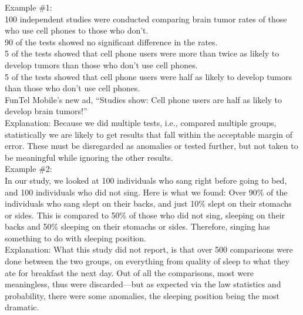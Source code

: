 \documentclass[a4paper,12pt,single,pdftex]{scrartcl}
\begin{document}
    
      Example \#1:
    \\

    
      100 independent studies were conducted comparing brain tumor rates of those who use cell phones to those who don’t.
    \\

    
      90 of the tests showed no significant difference in the rates.
    \\

    
      5 of the tests showed that cell phone users were more than twice as likely to develop tumors than those who don’t use cell phones.
    \\

    
      5 of the tests showed that cell phone users were half as likely to develop tumors than those who don’t use cell phones.
    \\

    
      FunTel Mobile’s new ad, “Studies show: Cell phone users are half as likely to develop brain tumors!”
    \\

    
      Explanation: Because we did multiple tests, i.e., compared multiple groups, statistically we are likely to get results that fall within the acceptable margin of error.  These must be disregarded as anomalies or tested further, but not taken to be meaningful while ignoring the other results.
    \\

    
      Example \#2:
    \\

    
      In our study, we looked at 100 individuals who sang right before going to bed, and 100 individuals who did not sing.  Here is what we found: Over 90\% of the individuals who sang slept on their backs, and just 10\% slept on their stomachs or sides.  This is compared to 50\% of those who did not sing, sleeping on their backs and 50\% sleeping on their stomachs or sides.  Therefore, singing has something to do with sleeping position.
    \\

    
      Explanation: What this study did not report, is that over 500 comparisons were done between the two groups, on everything from quality of sleep to what they ate for breakfast the next day.  Out of all the comparisons, most were meaningless, thus were discarded—but as expected via the law statistics and probability, there were some anomalies, the sleeping position being the most dramatic. 
    \\
\end{document}
